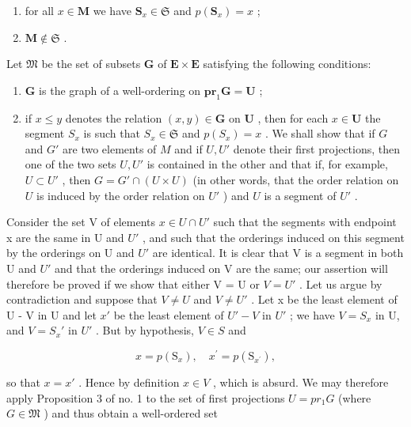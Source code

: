 \begin{enumerate}
\def\labelenumi{(\arabic{enumi})}
\item
  for all \(x \in \mathbf{M}\) we have \(\mathbf{S}_x \in \mathfrak{S}\) and \(p(\mathbf{S}_x) = x\) ;
\item
  \(\mathbf{M} \notin \mathfrak{S}\) .
\end{enumerate}

Let \(\mathfrak{M}\) be the set of subsets \(\mathbf{G}\) of \(\mathbf{E} \times \mathbf{E}\) satisfying the following conditions:

\begin{enumerate}
\def\labelenumi{(\alph{enumi})}
\item
  \(\mathbf{G}\) is the graph of a well-ordering on \(\mathbf{pr}_1\mathbf{G} = \mathbf{U}\) ;
\item
  if \(x \leqslant y\) denotes the relation \((x, y) \in \mathbf{G}\) on \(\mathbf{U}\) , then for each \(x \in \mathbf{U}\) the segment \(S_x\) is such that \(S_x \in \mathfrak{S}\) and \(p(S_x) = x\) . We shall show that if \(G\) and \(G'\) are two elements of \(M\) and if \(U, U'\) denote their first projections, then one of the two sets \(U, U'\) is contained in the other and that if, for example, \(U \subset U'\) , then \(G = G' \cap (U \times U)\) (in other words, that the order relation on \(U\) is induced by the order relation on \(U'\) ) and \(U\) is a segment of \(U'\) .
\end{enumerate}

Consider the set V of elements \(x \in U \cap U'\) such that the segments with endpoint x are the same in U and \(U'\) , and such that the orderings induced on this segment by the orderings on U and \(U'\) are identical. It is clear that V is a segment in both U and \(U'\) and that the orderings induced on V are the same; our assertion will therefore be proved if we show that either V = U or \(V = U'\) . Let us argue by contradiction and suppose that \(V \neq U\) and \(V \neq U'\) . Let x be the least element of U - V in U and let \(x'\) be the least element of \(U' - V\) in \(U'\) ; we have \(V = S_x\) in U, and \(V = S_x'\) in \(U'\) . But by hypothesis, \(V \in S\) and

\[
x = p \left(\mathrm{S} _ {x}\right), \quad x ^ {\prime} = p \left(\mathrm{S} _ {x ^ {\prime}}\right),
\]

so that \(x = x'\) . Hence by definition \(x \in V\) , which is absurd. We may therefore apply Proposition 3 of no. 1 to the set of first projections \(U = pr_1G\) (where \(G \in \mathfrak{M}\) ) and thus obtain a well-ordered set

